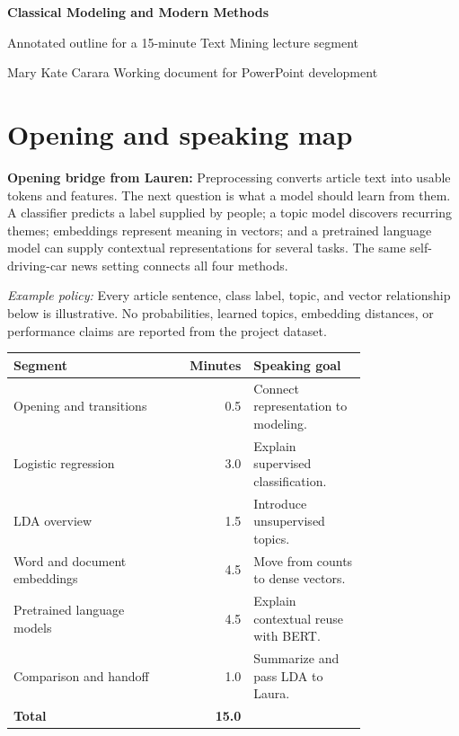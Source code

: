 \documentclass[11pt]{article}
\begin{document}
\begin{center}
  {\LARGE\bfseries\color{ink} Classical Modeling and Modern Methods}\par
  \vspace{0.25em}
  {\large Annotated outline for a 15-minute Text Mining lecture segment}\par
  \vspace{0.45em}
  Mary Kate Carara \quad\textbar\quad Working document for PowerPoint development
\end{center}

\section*{Opening and speaking map}

\textbf{Opening bridge from Lauren:} Preprocessing converts article text into usable tokens and features. The next question is what a model should learn from them. A classifier predicts a label supplied by people; a topic model discovers recurring themes; embeddings represent meaning in vectors; and a pretrained language model can supply contextual representations for several tasks. The same self-driving-car news setting connects all four methods.\par

\textit{Example policy:} Every article sentence, class label, topic, and vector relationship below is illustrative. No probabilities, learned topics, embedding distances, or performance claims are reported from the project dataset.

\begin{center}
\begin{tabular}{@{}p{0.46\linewidth}rp{0.32\linewidth}@{}}
\toprule
Segment & Minutes & Speaking goal \\
\midrule
Opening and transitions & 0.5 & Connect representation to modeling. \\
Logistic regression & 3.0 & Explain supervised classification. \\
LDA overview & 1.5 & Introduce unsupervised topics. \\
Word and document embeddings & 4.5 & Move from counts to dense vectors. \\
Pretrained language models & 4.5 & Explain contextual reuse with BERT. \\
Comparison and handoff & 1.0 & Summarize and pass LDA to Laura. \\
\midrule
\textbf{Total} & \textbf{15.0} & \\
\bottomrule
\end{tabular}
\end{center}
\end{document}

